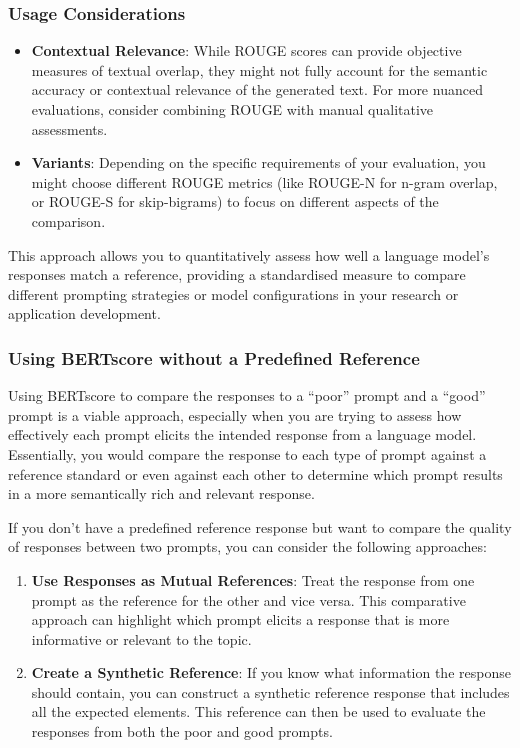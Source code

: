 \documentclass[
]{agujournal2019}
\providecommand{\tightlist}{%
  \setlength{\itemsep}{0pt}\setlength{\parskip}{0pt}}\usepackage{longtable,booktabs,array}
\begin{document}
\subsubsection{Usage Considerations}\label{usage-considerations}

\begin{itemize}
\tightlist
\item
  \textbf{Contextual Relevance}: While ROUGE scores can provide
  objective measures of textual overlap, they might not fully account
  for the semantic accuracy or contextual relevance of the generated
  text. For more nuanced evaluations, consider combining ROUGE with
  manual qualitative assessments.
\item
  \textbf{Variants}: Depending on the specific requirements of your
  evaluation, you might choose different ROUGE metrics (like ROUGE-N for
  n-gram overlap, or ROUGE-S for skip-bigrams) to focus on different
  aspects of the comparison.
\end{itemize}

This approach allows you to quantitatively assess how well a language
model's responses match a reference, providing a standardised measure to
compare different prompting strategies or model configurations in your
research or application development.

\subsubsection{Using BERTscore without a Predefined
Reference}\label{using-bertscore-without-a-predefined-reference}

Using BERTscore to compare the responses to a ``poor'' prompt and a
``good'' prompt is a viable approach, especially when you are trying to
assess how effectively each prompt elicits the intended response from a
language model. Essentially, you would compare the response to each type
of prompt against a reference standard or even against each other to
determine which prompt results in a more semantically rich and relevant
response.

If you don't have a predefined reference response but want to compare
the quality of responses between two prompts, you can consider the
following approaches:

\begin{enumerate}
\def\labelenumi{\arabic{enumi}.}
\item
  \textbf{Use Responses as Mutual References}: Treat the response from
  one prompt as the reference for the other and vice versa. This
  comparative approach can highlight which prompt elicits a response
  that is more informative or relevant to the topic.
\item
  \textbf{Create a Synthetic Reference}: If you know what information
  the response should contain, you can construct a synthetic reference
  response that includes all the expected elements. This reference can
  then be used to evaluate the responses from both the poor and good
  prompts.
\end{enumerate}
\end{document}
